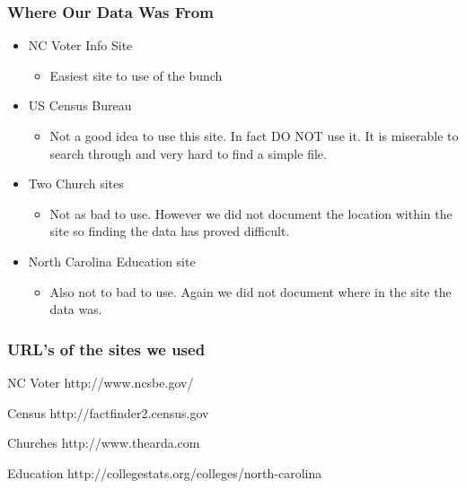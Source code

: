 \documentclass{beamer}\usepackage[]{graphicx}\usepackage[]{color}
\begin{document}

\begin{frame}
\frametitle{Where Our Data Was From}
\begin{itemize}
\item NC Voter Info Site
\begin{itemize}
\item Easiest site to use of the bunch
\end{itemize}
\item US Census Bureau
\begin{itemize}
\item Not a good idea to use this site. In fact DO NOT use it.  It is miserable to search through and very hard to find a simple file.
\end{itemize}
\item Two Church sites
\begin{itemize}
\item Not as bad to use.  However we did not document the location within the site so finding the data has proved difficult.
\end{itemize}
\item North Carolina Education site
\begin{itemize}
\item Also not to bad to use. Again we did not document where in the site the data was.
\end{itemize}
\end{itemize}
\end{frame}


\begin{frame}
\frametitle{URL's of the sites we used}
\begin{block}{NC Voter}
http://www.ncsbe.gov/
\end{block}

\begin{block}{Census}
http://factfinder2.census.gov
\end{block}

\begin{block}{Churches}
http://www.thearda.com
\end{block}

\begin{block}{Education}
http://collegestats.org/colleges/north-carolina
\end{block}
\end{frame}
\end{document}
